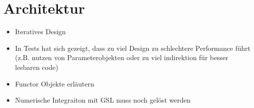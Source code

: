 \section{Architektur}



\begin{itemize}
    \item Iteratives Design 
    \item In Tests hat sich gezeigt, dass zu viel Design zu schlechtere Performance führt (z.B. nutzen von Parameterobjekten oder zu viel indirektion für besser lesbaren code)
    \item Functor Objekte erläutern
    \item Numerische Integraiton mit GSL muss noch gelöst werden
\end{itemize}




